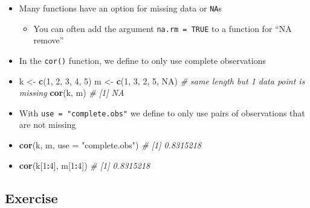 \documentclass[
]{book}
\newenvironment{Shaded}{\begin{snugshade}}{\end{snugshade}}
\newcommand{\AttributeTok}[1]{\textcolor[rgb]{0.13,0.29,0.53}{#1}}
\newcommand{\CommentTok}[1]{\textcolor[rgb]{0.56,0.35,0.01}{\textit{#1}}}
\newcommand{\ConstantTok}[1]{\textcolor[rgb]{0.56,0.35,0.01}{#1}}
\newcommand{\DecValTok}[1]{\textcolor[rgb]{0.00,0.00,0.81}{#1}}
\newcommand{\FunctionTok}[1]{\textcolor[rgb]{0.13,0.29,0.53}{\textbf{#1}}}
\newcommand{\NormalTok}[1]{#1}
\newcommand{\OtherTok}[1]{\textcolor[rgb]{0.56,0.35,0.01}{#1}}
\newcommand{\SpecialCharTok}[1]{\textcolor[rgb]{0.81,0.36,0.00}{\textbf{#1}}}
\newcommand{\StringTok}[1]{\textcolor[rgb]{0.31,0.60,0.02}{#1}}
\providecommand{\tightlist}{%
  \setlength{\itemsep}{0pt}\setlength{\parskip}{0pt}}
\begin{document}
\begin{itemize}
\item
  Many functions have an option for missing data or \texttt{NA}s

  \begin{itemize}
  \tightlist
  \item
    You can often add the argument \texttt{na.rm\ =\ TRUE} to a function for ``NA remove''
  \end{itemize}
\item
  In the \texttt{cor()} function, we define to only use complete observations
\item
\begin{Shaded}
\begin{Highlighting}[]
\NormalTok{k }\OtherTok{\textless{}{-}} \FunctionTok{c}\NormalTok{(}\DecValTok{1}\NormalTok{, }\DecValTok{2}\NormalTok{, }\DecValTok{3}\NormalTok{, }\DecValTok{4}\NormalTok{, }\DecValTok{5}\NormalTok{)}
\NormalTok{m }\OtherTok{\textless{}{-}} \FunctionTok{c}\NormalTok{(}\DecValTok{1}\NormalTok{, }\DecValTok{3}\NormalTok{, }\DecValTok{2}\NormalTok{, }\DecValTok{5}\NormalTok{, }\ConstantTok{NA}\NormalTok{) }\CommentTok{\# same length but 1 data point is missing}
\FunctionTok{cor}\NormalTok{(k, m)}
\CommentTok{\# [1] NA}
\end{Highlighting}
\end{Shaded}
\item
  With \texttt{use\ =\ "complete.obs"} we define to only use pairs of observations that are not missing
\item
\begin{Shaded}
\begin{Highlighting}[]
\FunctionTok{cor}\NormalTok{(k, m, }\AttributeTok{use =} \StringTok{"complete.obs"}\NormalTok{)}
\CommentTok{\# [1] 0.8315218}
\end{Highlighting}
\end{Shaded}
\item
\begin{Shaded}
\begin{Highlighting}[]
\FunctionTok{cor}\NormalTok{(k[}\DecValTok{1}\SpecialCharTok{:}\DecValTok{4}\NormalTok{], m[}\DecValTok{1}\SpecialCharTok{:}\DecValTok{4}\NormalTok{])}
\CommentTok{\# [1] 0.8315218}
\end{Highlighting}
\end{Shaded}
\end{itemize}

\subsection{Exercise}\label{exercise-5}
\end{document}
